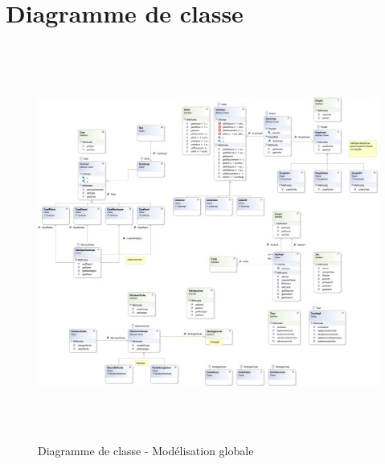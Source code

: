 \documentclass[a4paper,11pt]{article}
\begin{document}
\section{Diagramme de classe}
	\vspace*{0.5cm}
	\lipsum[1]
	\vspace*{0.5cm}
	\begin{figure}[ht!]
		\includegraphics[height=13cm,width=15cm]{Diagrammes/Classe/classe.png}
		\caption{Diagramme de classe - Modélisation globale}
		\label{fig:classe}
	\end{figure}
	\newpage
\end{document}

